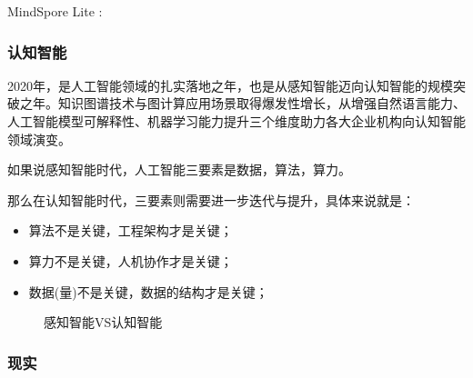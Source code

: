 \documentclass[letterpaper,11pt,english]{sphinxmanual}
\begin{document}
MindSpore Lite :


\subsubsection{认知智能}
\label{\detokenize{chapter_AI_dive/cognition_AI:id1}}\label{\detokenize{chapter_AI_dive/cognition_AI::doc}}
2020年，是人工智能领域的扎实落地之年，也是从感知智能迈向认知智能的规模突破之年。知识图谱技术与图计算应用场景取得爆发性增长，从增强自然语言能力、人工智能模型可解释性、机器学习能力提升三个维度助力各大企业机构向认知智能领域演变。%
\begin{footnote}[861]\sphinxAtStartFootnote
{}
%
\end{footnote}

如果说感知智能时代，人工智能三要素是数据，算法，算力。

那么在认知智能时代，三要素则需要进一步迭代与提升，具体来说就是：
\begin{itemize}
\item {} 
算法不是关键，工程架构才是关键；

\item {} 
算力不是关键，人机协作才是关键；

\item {} 
数据(量)不是关键，数据的结构才是关键；

\end{itemize}

\begin{figure}[H]
\centering
\capstart

\noindent{}
\caption{感知智能VS认知智能}\label{\detokenize{chapter_AI_dive/cognition_AI:id2}}\end{figure}


\subsubsection{现实}
\label{\detokenize{chapter_AI_dive/real:id1}}\label{\detokenize{chapter_AI_dive/real::doc}}
\end{document}
